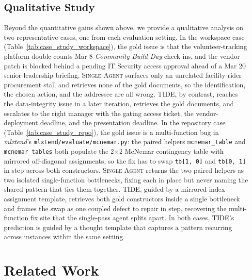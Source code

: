 \documentclass{llmxive}
\begin{document}
\subsection{Qualitative Study}
Beyond the quantitative gains shown above, we provide a qualitative analysis on two representative cases, one from each evaluation setting.
In the workspace case (Table~\ref{tab:case_study_workspace}), the gold issue is that the volunteer-tracking platform double-counts Mar 8 \textit{Community Build Day} check-ins, and the vendor patch is blocked behind a pending IT Security access approval ahead of a Mar 20 senior-leadership briefing. \textsc{Single-Agent} surfaces only an unrelated facility-rider procurement stall and retrieves none of the gold documents, so the identification, the chosen action, and the addressee are all wrong. \textsc{TIDE}, by contrast, reaches the data-integrity issue in a later iteration, retrieves the gold documents, and escalates to the right manager with the gating access ticket, the vendor-deployment deadline, and the presentation deadline.
In the repository case (Table~\ref{tab:case_study_repo}), the gold issue is a multi-function bug in \textit{mlxtend}'s \texttt{mlxtend/evaluate/mcnemar.py}: the paired helpers \texttt{mcnemar\_table} and \texttt{mcnemar\_tables} both populate the 2$\times$2 McNemar contingency table with mirrored off-diagonal assignments, so the fix has to swap \texttt{tb[1, 0]} and \texttt{tb[0, 1]} in step across both constructors. \textsc{Single-Agent} returns the two paired helpers as two isolated single-function bottlenecks, fixing each in place but never naming the shared pattern that ties them together. \textsc{TIDE}, guided by a mirrored-index-assignment template, retrieves both gold constructors inside a single bottleneck and frames the swap as one coupled defect to repair in step, recovering the multi-function fix site that the single-pass agent splits apart.
In both cases, \textsc{TIDE}'s prediction is guided by a thought template that captures a pattern recurring across instances within the same setting.

\section{Related Work}
\end{document}
